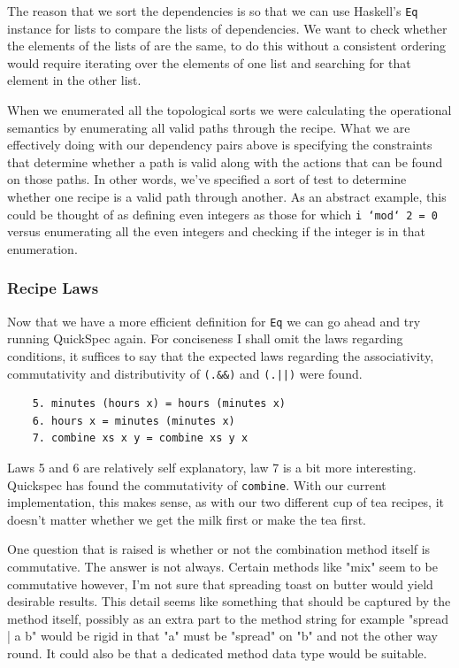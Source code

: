 \documentclass[11pt]{article}
\begin{document}
The reason that we sort the dependencies is so that we can use Haskell's \texttt{Eq} instance
for lists to compare the lists of dependencies. We want to check whether the elements of
the lists of are the same, to do this without a consistent ordering would require iterating
over the elements of one list and searching for that element in the other list.

\medbreak

When we enumerated all the topological sorts we were calculating the operational semantics
by enumerating all valid paths through the recipe. What we are effectively doing with our
dependency pairs above is specifying the constraints that determine whether a path is valid
along with the actions that can be found on those paths. In other words, we've specified a
sort of test to determine whether one recipe is a valid path through another. As an abstract
example, this could be thought of as defining even integers as those for which \texttt{i `mod` 2 = 0}
versus enumerating all the even integers and checking if the integer is in that enumeration.

\subsubsection{Recipe Laws}

Now that we have a more efficient definition for \texttt{Eq} we can go ahead and
try running QuickSpec again. For conciseness I shall omit the laws regarding
conditions, it suffices to say that the expected laws regarding the associativity,
commutativity and distributivity of \texttt{(.\&\&)} and \texttt{(.||)} were found.

\begin{lstlisting}
    5. minutes (hours x) = hours (minutes x)
    6. hours x = minutes (minutes x)
    7. combine xs x y = combine xs y x
\end{lstlisting}

Laws 5 and 6 are relatively self explanatory, law 7 is a bit more interesting.
Quickspec has found the commutativity of \texttt{combine}. With our current implementation,
this makes sense, as with our two different cup of tea recipes, it doesn't matter whether
we get the milk first or make the tea first. 

\medbreak

One question that is raised
is whether or not the combination method itself is commutative. The answer
is not always. Certain methods like "mix" seem to be commutative however,
I'm not sure that spreading toast on butter would yield desirable results.
This detail seems like something that should be captured by the method itself,
possibly as an extra part to the method string for example "spread | a b" would
be rigid in that "a" must be "spread" on "b" and not the other way round.
It could also be that a dedicated method data type would be suitable.
\end{document}
